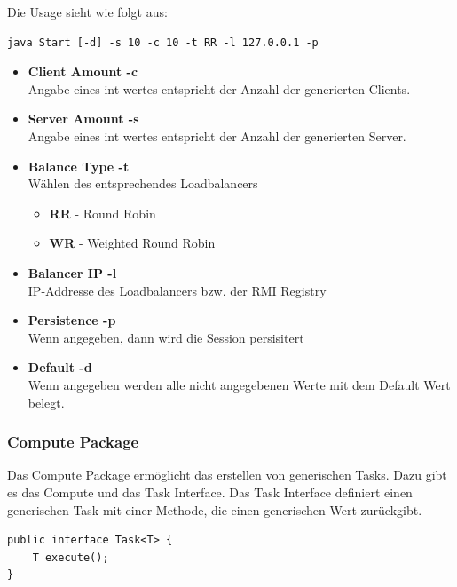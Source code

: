 Die Usage sieht wie folgt aus:
\begin{lstlisting}[style=Java, caption=Usage]	
java Start [-d] -s 10 -c 10 -t RR -l 127.0.0.1 -p
\end{lstlisting}

\begin{itemize}
	\item \textbf{Client Amount -c}\\
	Angabe eines int wertes entspricht der Anzahl der generierten Clients.
	
	\item \textbf{Server Amount -s}\\
	Angabe eines int wertes entspricht der Anzahl der generierten Server.
	
	\item \textbf{Balance Type -t}\\
	Wählen des entsprechendes Loadbalancers
	\begin{itemize}
		\item \textbf{RR} - Round Robin
		\item \textbf{WR} - Weighted Round Robin
	\end{itemize}
	
	\item \textbf{Balancer IP -l}\\
	IP-Addresse des Loadbalancers bzw. der RMI Registry
	
	\item \textbf{Persistence -p}\\
	Wenn angegeben, dann wird die Session persisitert
	
	\item \textbf{Default -d}\\
	Wenn angegeben werden alle nicht angegebenen Werte mit dem Default Wert belegt.
\end{itemize}

\clearpage

\subsubsection{Compute Package}
Das Compute Package ermöglicht das erstellen von generischen Tasks.
Dazu gibt es das Compute und das Task Interface. 
Das Task Interface definiert einen generischen Task mit einer Methode, die einen generischen Wert zurückgibt. 

\begin{lstlisting}[style=Java, caption=generic Task Interface]	
public interface Task<T> {
	T execute();
}
\end{lstlisting}

